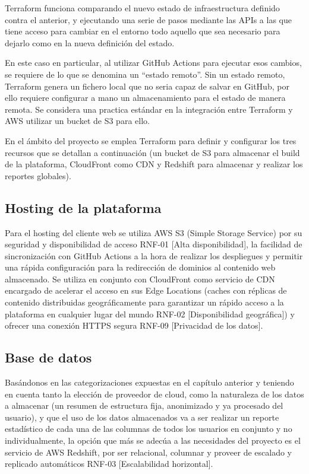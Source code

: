 Terraform funciona comparando el nuevo estado de infraestructura definido contra el anterior, y ejecutando una serie de pasos mediante las APIs a las que tiene acceso para cambiar en el entorno todo aquello que sea necesario para dejarlo como en la nueva definición del estado.

En este caso en particular, al utilizar GitHub Actions para ejecutar esos cambios, se requiere de lo que se denomina un ``estado remoto''. Sin un estado remoto, Terraform genera un fichero local que no seria capaz de salvar en GitHub, por ello requiere configurar a mano un almacenamiento para el estado de manera remota. Se considera una practica estándar en la integración entre Terraform y AWS utilizar un bucket de S3 para ello.

En el ámbito del proyecto se emplea Terraform para definir y configurar los tres recursos que se detallan a continuación (un bucket de S3 para almacenar el build de la plataforma, CloudFront como CDN y Redshift para almacenar y realizar los reportes globales).

\subsection{Hosting de la plataforma}

Para el hosting del cliente web se utiliza AWS S3 (Simple Storage Service) por su seguridad y disponibilidad de acceso RNF-01 [Alta disponibilidad], la facilidad de sincronización con GitHub Actions a la hora de realizar los despliegues y permitir una rápida configuración para la redirección de dominios al contenido web almacenado. Se utiliza en conjunto con CloudFront como servicio de CDN encargado de acelerar el acceso en sus Edge Locations (caches con réplicas de contenido distribuidas geográficamente para garantizar un rápido acceso a la plataforma en cualquier lugar del mundo RNF-02 [Disponibilidad geográfica]) y ofrecer una conexión HTTPS segura RNF-09 [Privacidad de los datos].

\subsection{Base de datos}

Basándonos en las categorizaciones expuestas en el capítulo anterior y teniendo en cuenta tanto la elección de proveedor de cloud, como la naturaleza de los datos a almacenar (un resumen de estructura fija, anonimizado y ya procesado del usuario), y que el uso de los datos almacenados va a ser realizar un reporte estadístico de cada una de las columnas de todos los usuarios en conjunto y no individualmente, la opción que más se adecúa a las necesidades del proyecto es el servicio de AWS Redshift, por ser relacional, columnar y proveer de escalado y replicado automáticos RNF-03 [Escalabilidad horizontal].

